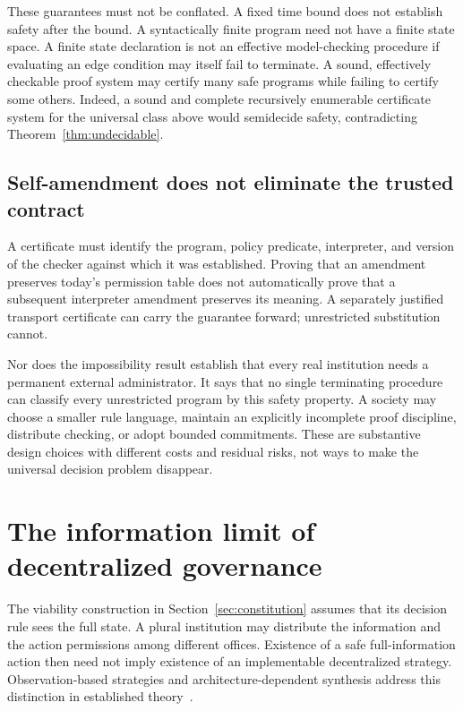 \documentclass[11pt,letterpaper]{article}
\theoremstyle{plain}
\theoremstyle{definition}
\theoremstyle{remark}
\begin{document}
These guarantees must not be conflated. A fixed time bound does not establish safety after the bound. A syntactically finite program need not have a finite state space. A finite state declaration is not an effective model-checking procedure if evaluating an edge condition may itself fail to terminate. A sound, effectively checkable proof system may certify many safe programs while failing to certify some others. Indeed, a sound and complete recursively enumerable certificate system for the universal class above would semidecide safety, contradicting Theorem~\ref{thm:undecidable}.

\subsection{Self-amendment does not eliminate the trusted contract}
A certificate must identify the program, policy predicate, interpreter, and version of the checker against which it was established. Proving that an amendment preserves today's permission table does not automatically prove that a subsequent interpreter amendment preserves its meaning. A separately justified transport certificate can carry the guarantee forward; unrestricted substitution cannot.

Nor does the impossibility result establish that every real institution needs a permanent external administrator. It says that no single terminating procedure can classify every unrestricted program by this safety property. A society may choose a smaller rule language, maintain an explicitly incomplete proof discipline, distribute checking, or adopt bounded commitments. These are substantive design choices with different costs and residual risks, not ways to make the universal decision problem disappear.

\section{The information limit of decentralized governance}\label{sec:decentral}
The viability construction in Section~\ref{sec:constitution} assumes that its decision rule sees the full state. A plural institution may distribute the information and the action permissions among different offices. Existence of a safe full-information action then need not imply existence of an implementable decentralized strategy. Observation-based strategies and architecture-dependent synthesis address this distinction in established theory~\cite{chatterjee,pnuelirosner}.
\end{document}
